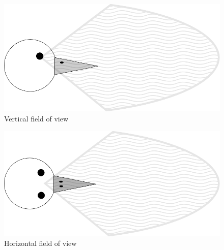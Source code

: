 \documentclass[journal,transmag]{IEEEtran}
\begin{document}
\begin{figure}[h!]
\centering
\includegraphics[scale=0.38]{./images/verticalFow.png}
\caption[Horizontal field of view]{Vertical field of view}
\label{fig:hfow}
\end{figure}


\begin{figure}[h!]
\centering
\includegraphics[scale=0.38]{./images/hFow.png}
\caption[Simulation of 605 birds on sequential application]{Horizontal field of
view}
\label{fig:vfow}
\end{figure}


\pagebreak
\end{document}
